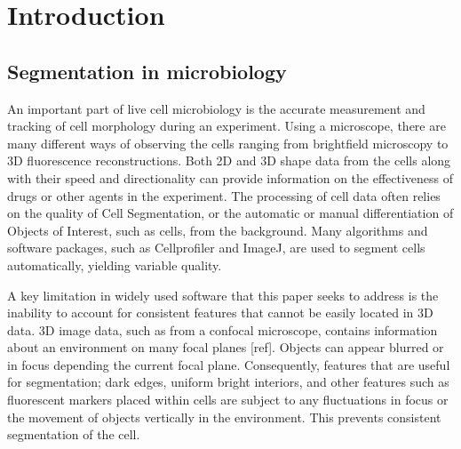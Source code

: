 
\chapter{Introduction}  %

\ifpdf
    \graphicspath{{Chapter1/Figs/Raster/}{Chapter1/Figs/PDF/}{Chapter1/Figs/}}
\else
    \graphicspath{{Chapter1/Figs/Vector/}{Chapter1/Figs/}}
\fi


\section{Segmentation in microbiology}

An important part of live cell microbiology is the accurate measurement and tracking of cell morphology during an experiment. Using a microscope, there are many different ways of observing the cells ranging from brightfield microscopy to 3D fluorescence reconstructions. Both 2D and 3D shape data from the cells along with their speed and directionality can provide information on the effectiveness of drugs or other agents in the experiment. The processing of cell data often relies on the quality of Cell Segmentation, or the automatic or manual differentiation of Objects of Interest, such as cells, from the background. Many algorithms and software packages, such as Cellprofiler and ImageJ, are used to segment cells automatically, yielding variable quality.

A key limitation in widely used software that this paper seeks to address is the inability to account for consistent features that cannot be easily located in 3D data. 3D image data, such as from a confocal microscope, contains information about an environment on many focal planes [ref]. Objects can appear blurred or in focus depending the current focal plane. Consequently, features that are useful for segmentation; dark edges, uniform bright interiors, and other features such as fluorescent markers placed within cells are subject to any fluctuations in focus or the movement of objects vertically in the environment. This prevents consistent segmentation of the cell.

